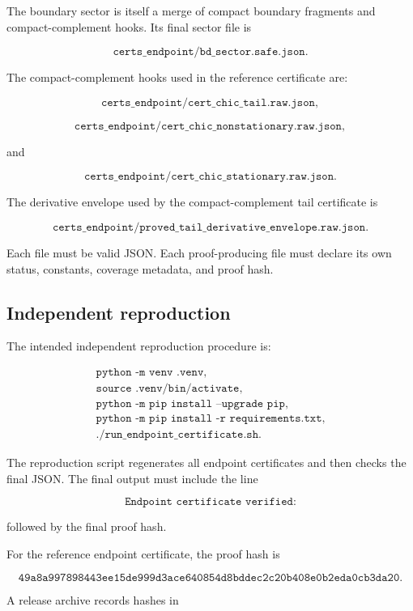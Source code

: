 \documentclass[11pt]{article}
\begin{document}
The boundary sector is itself a merge of compact boundary fragments and compact-complement hooks.  Its final sector file is

\[
\texttt{certs\_endpoint/bd\_sector.safe.json}.
\]

The compact-complement hooks used in the reference certificate are:

\[
\texttt{certs\_endpoint/cert\_chic\_tail.raw.json},
\]

\[
\texttt{certs\_endpoint/cert\_chic\_nonstationary.raw.json},
\]

and

\[
\texttt{certs\_endpoint/cert\_chic\_stationary.raw.json}.
\]

The derivative envelope used by the compact-complement tail certificate is

\[
\texttt{certs\_endpoint/proved\_tail\_derivative\_envelope.raw.json}.
\]

Each file must be valid JSON.  Each proof-producing file must declare its own status, constants, coverage metadata, and proof hash.

\subsection{Independent reproduction}

The intended independent reproduction procedure is:

\[
\begin{array}{l}
\texttt{python -m venv .venv},\\
\texttt{source .venv/bin/activate},\\
\texttt{python -m pip install --upgrade pip},\\
\texttt{python -m pip install -r requirements.txt},\\
\texttt{./run\_endpoint\_certificate.sh}.
\end{array}
\]

The reproduction script regenerates all endpoint certificates and then checks the final JSON.  The final output must include the line

\[
\texttt{Endpoint certificate verified:}
\]

followed by the final proof hash.

For the reference endpoint certificate, the proof hash is

\[
\texttt{49a8a997898443ee15de999d3ace640854d8bddec2c20b408e0b2eda0cb3da20}.
\]

A release archive records hashes in
\end{document}
